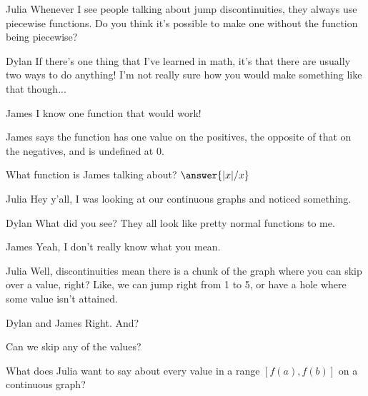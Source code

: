 \documentclass{ximera}
\begin{document}
\begin{dialogue}
\item[Julia] Whenever I see people talking about jump discontinuities, they always use piecewise functions. Do you think it's possible to make one without the function being piecewise?
\item[Dylan] If there's one thing that I've learned in math, it's that there are usually two ways to do anything! I'm not really sure how you would make something like that though...
\item[James] I know one function that would work!
\end{dialogue}

\begin{question}
\begin{hint}
James says the function has one value on the positives, the opposite of that on the negatives, and is undefined at 0.
\end{hint}
What function is James talking about?
$\answer{|x|/x}$
\end{question}

\begin{dialogue}
\item[Julia] Hey y'all, I was looking at our continuous graphs and noticed something.
\item[Dylan] What did you see? They all look like pretty normal functions to me.
\item[James] Yeah, I don't really know what you mean.
\item[Julia] Well, discontinuities mean there is a chunk of the graph where you can skip over a value, right? Like, we can jump right from 1 to 5, or have a hole where some value isn't attained.
\item[Dylan and James] Right. And?
\end{dialogue}

\begin{question}
\begin{hint}
Can we skip any of the values?
\end{hint}
What does Julia want to say about every value in a range $[f(a),f(b)]$ on a continuous graph?
\begin{multipleChoice}
\end{multipleChoice}
\end{question}
\end{document}
